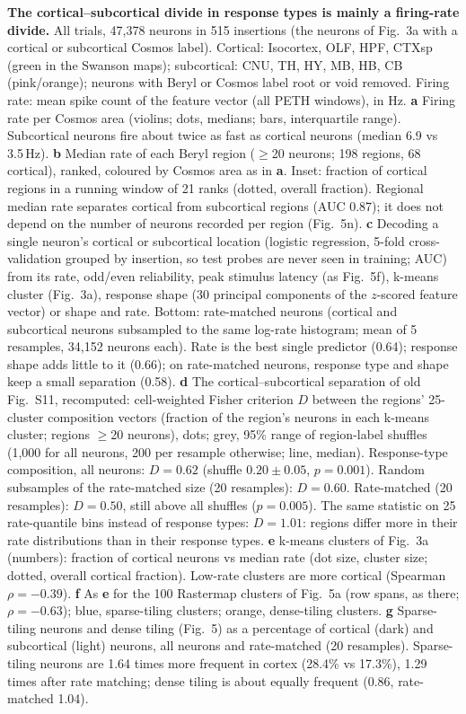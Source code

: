 \caption{\textbf{The cortical--subcortical divide in response types is mainly a firing-rate divide.}
All trials, 47,378 neurons in 515 insertions (the neurons of Fig.~3a with a cortical or subcortical Cosmos label). Cortical: Isocortex, OLF, HPF, CTXsp (green in the Swanson maps); subcortical: CNU, TH, HY, MB, HB, CB (pink/orange); neurons with Beryl or Cosmos label root or void removed. Firing rate: mean spike count of the feature vector (all PETH windows), in Hz.
\textbf{a} Firing rate per Cosmos area (violins; dots, medians; bars, interquartile range). Subcortical neurons fire about twice as fast as cortical neurons (median 6.9 vs 3.5\,Hz).
\textbf{b} Median rate of each Beryl region ($\geq$20 neurons; 198 regions, 68 cortical), ranked, coloured by Cosmos area as in \textbf{a}. Inset: fraction of cortical regions in a running window of 21 ranks (dotted, overall fraction). Regional median rate separates cortical from subcortical regions (AUC 0.87); it does not depend on the number of neurons recorded per region (Fig.~5n).
\textbf{c} Decoding a single neuron's cortical or subcortical location (logistic regression, 5-fold cross-validation grouped by insertion, so test probes are never seen in training; AUC) from its rate, odd/even reliability, peak stimulus latency (as Fig.~5f), k-means cluster (Fig.~3a), response shape (30 principal components of the $z$-scored feature vector) or shape and rate. Bottom: rate-matched neurons (cortical and subcortical neurons subsampled to the same log-rate histogram; mean of 5 resamples, 34,152 neurons each). Rate is the best single predictor (0.64); response shape adds little to it (0.66); on rate-matched neurons, response type and shape keep a small separation (0.58).
\textbf{d} The cortical--subcortical separation of old Fig.~S11, recomputed: cell-weighted Fisher criterion $D$ between the regions' 25-cluster composition vectors (fraction of the region's neurons in each k-means cluster; regions $\geq$20 neurons), dots; grey, 95\% range of region-label shuffles (1,000 for all neurons, 200 per resample otherwise; line, median). Response-type composition, all neurons: $D=0.62$ (shuffle $0.20\pm0.05$, $p=0.001$). Random subsamples of the rate-matched size (20 resamples): $D=0.60$. Rate-matched (20 resamples): $D=0.50$, still above all shuffles ($p=0.005$). The same statistic on 25 rate-quantile bins instead of response types: $D=1.01$: regions differ more in their rate distributions than in their response types.
\textbf{e} k-means clusters of Fig.~3a (numbers): fraction of cortical neurons vs median rate (dot size, cluster size; dotted, overall cortical fraction). Low-rate clusters are more cortical (Spearman $\rho=-0.39$).
\textbf{f} As \textbf{e} for the 100 Rastermap clusters of Fig.~5a (row spans, as there; $\rho=-0.63$); blue, sparse-tiling clusters; orange, dense-tiling clusters.
\textbf{g} Sparse-tiling neurons and dense tiling (Fig.~5) as a percentage of cortical (dark) and subcortical (light) neurons, all neurons and rate-matched (20 resamples). Sparse-tiling neurons are 1.64 times more frequent in cortex (28.4\% vs 17.3\%), 1.29 times after rate matching; dense tiling is about equally frequent (0.86, rate-matched 1.04).}
\label{fig:cortex_rate}
